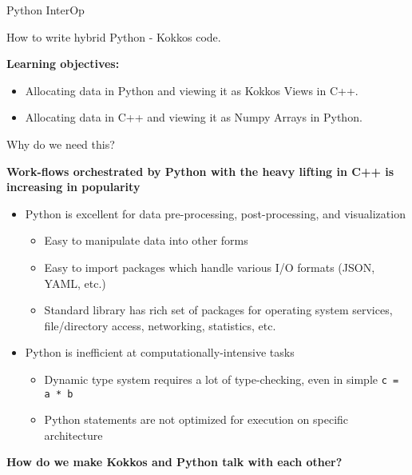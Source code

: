 


\begin{frame}[fragile]

  {\Huge Python InterOp}

  \vspace{10pt}

  {\large How to write hybrid Python - Kokkos code.}

  \vspace{20pt}

  \textbf{Learning objectives:}
  \begin{itemize}
    \item {Allocating data in Python and viewing it as Kokkos Views in C++.}
    \item {Allocating data in C++ and viewing it as Numpy Arrays in Python.}
  \end{itemize}

  \vspace{-20pt}

\end{frame}


\begin{frame}[fragile]{Why do we need this?}

\textbf{Work-flows orchestrated by Python with the heavy lifting in C++ is increasing in popularity}

\begin{itemize}
  \item Python is excellent for data pre-processing, post-processing, and visualization
  \begin{itemize}
    \item Easy to manipulate data into other forms
    \item Easy to import packages which handle various I/O formats (JSON, YAML, etc.)
    \item Standard library has rich set of packages for operating system services, 
    file/directory access, networking, statistics, etc.
  \end{itemize}
  \item Python is inefficient at computationally-intensive tasks
  \begin{itemize}
    \item Dynamic type system requires a lot of type-checking, even in simple \lstinline|c = a * b|
    \item Python statements are not optimized for execution on specific architecture
  \end{itemize}
\end{itemize}

\pause
\textbf{How do we make Kokkos and Python talk with each other?}
\end{frame}

